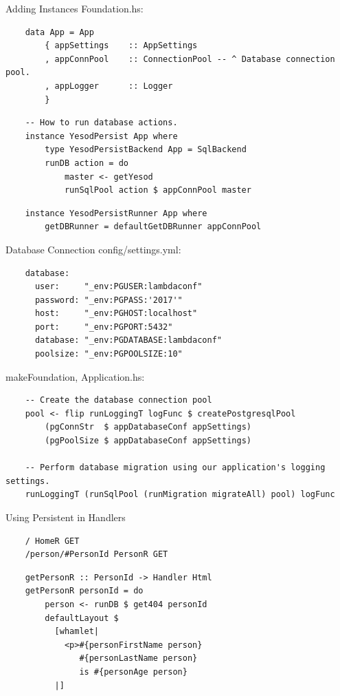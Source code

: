\documentclass[pdf]{beamer}
\begin{document}
\begin{frame}[fragile]{Adding Instances}
  Foundation.hs:
  \begin{verbatim}
    data App = App
        { appSettings    :: AppSettings
        , appConnPool    :: ConnectionPool -- ^ Database connection pool.
        , appLogger      :: Logger
        }
  \end{verbatim}
  \pause
  \begin{verbatim}
    -- How to run database actions.
    instance YesodPersist App where
        type YesodPersistBackend App = SqlBackend
        runDB action = do
            master <- getYesod
            runSqlPool action $ appConnPool master
  \end{verbatim}
  \pause
  \begin{verbatim}
    instance YesodPersistRunner App where
        getDBRunner = defaultGetDBRunner appConnPool
  \end{verbatim}
\end{frame}

\begin{frame}[fragile]{Database Connection}
  config/settings.yml:
  \begin{verbatim}
    database:
      user:     "_env:PGUSER:lambdaconf"
      password: "_env:PGPASS:'2017'"
      host:     "_env:PGHOST:localhost"
      port:     "_env:PGPORT:5432"
      database: "_env:PGDATABASE:lambdaconf"
      poolsize: "_env:PGPOOLSIZE:10"
  \end{verbatim}
  makeFoundation, Application.hs:
  \begin{verbatim}
    -- Create the database connection pool
    pool <- flip runLoggingT logFunc $ createPostgresqlPool
        (pgConnStr  $ appDatabaseConf appSettings)
        (pgPoolSize $ appDatabaseConf appSettings)

    -- Perform database migration using our application's logging settings.
    runLoggingT (runSqlPool (runMigration migrateAll) pool) logFunc
  \end{verbatim}
\end{frame}

\begin{frame}[fragile]{Using Persistent in Handlers}
  \begin{verbatim}
    / HomeR GET
    /person/#PersonId PersonR GET
  \end{verbatim}
  \begin{verbatim}
    getPersonR :: PersonId -> Handler Html
    getPersonR personId = do
        person <- runDB $ get404 personId
        defaultLayout $
          [whamlet|
            <p>#{personFirstName person}
               #{personLastName person}
               is #{personAge person}
          |]
  \end{verbatim}
\end{frame}
\end{document}

